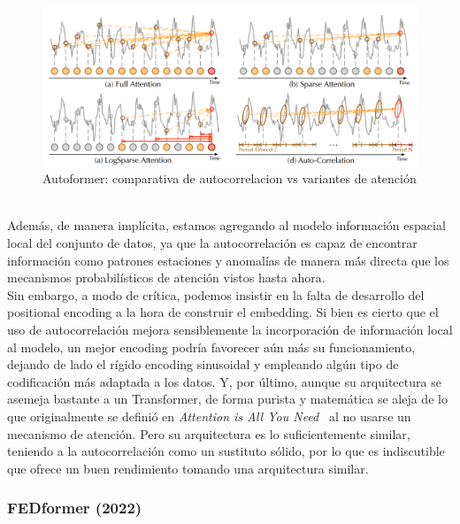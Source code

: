 \begin{figure}[!ht]
	\centering
	\includegraphics[scale=0.25]{img/muestreo.png}
	\caption{Autoformer: comparativa de autocorrelacion vs variantes de atención ~\cite{wu2022autoformerdecompositiontransformersautocorrelation}}
	\label{muestreo}
\end{figure}

Además, de manera implícita, estamos agregando al modelo información espacial local del conjunto de datos, ya que la autocorrelación es capaz de encontrar información como patrones estaciones y anomalías de manera más directa que los mecanismos probabilísticos de atención vistos hasta ahora.\\

Sin embargo, a modo de crítica, podemos insistir en la falta de desarrollo del positional encoding a la hora de construir el embedding. Si bien es cierto que el uso de autocorrelación mejora sensiblemente la incorporación de información local al modelo, un mejor encoding podría favorecer aún más su funcionamiento, dejando de lado el rígido encoding sinusoidal y empleando algún tipo de codificación más adaptada a los datos. Y, por último, aunque su arquitectura se asemeja bastante a un Transformer, de forma purista y matemática se aleja de lo que originalmente se definió en \textit{Attention is All You Need}~\cite{vaswani2023attentionneed} al no usarse un mecanismo de atención. Pero su arquitectura es lo suficientemente similar, teniendo a la autocorrelación como un sustituto sólido, por lo que es indiscutible que ofrece un buen rendimiento tomando una arquitectura similar.

\subsubsection{FEDformer (2022)}